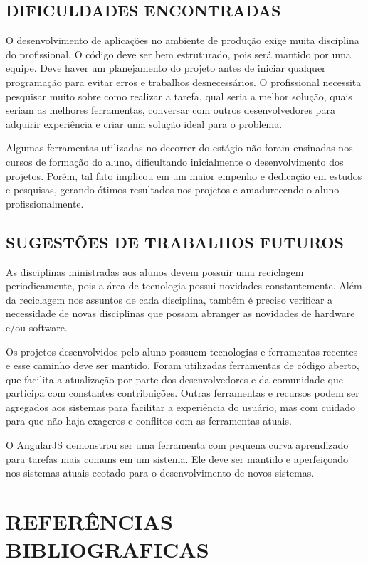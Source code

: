 \documentclass[
  12pt,				%
  openany,
  oneside,
  a4paper,			%
  english,			%
  brazil
]{article}
\numberwithin{figure}{section}
\numberwithin{table}{section}
\begin{document}
\subsection{DIFICULDADES ENCONTRADAS}

O desenvolvimento de aplicações no ambiente de produção exige muita disciplina do profissional. O código deve ser bem estruturado, pois será mantido por uma equipe. Deve haver um planejamento do projeto antes de iniciar qualquer programação para evitar erros e trabalhos desnecessários. O profissional necessita pesquisar muito sobre como realizar a tarefa, qual seria a melhor solução, quais seriam as melhores ferramentas, conversar com outros desenvolvedores para adquirir experiência e criar uma solução ideal para o problema.

Algumas ferramentas utilizadas no decorrer do estágio não foram ensinadas nos cursos de formação do aluno, dificultando inicialmente o desenvolvimento dos projetos. Porém, tal fato implicou em um maior empenho e dedicação em estudos e pesquisas, gerando ótimos resultados nos projetos e amadurecendo o aluno profissionalmente.


\subsection{SUGESTÕES DE TRABALHOS FUTUROS}

As disciplinas ministradas aos alunos devem possuir uma reciclagem periodicamente,
pois a área de tecnologia possui novidades constantemente. Além da reciclagem nos assuntos de cada disciplina, também é preciso verificar a necessidade de novas disciplinas que possam abranger as novidades de hardware e/ou software.

Os projetos desenvolvidos pelo aluno possuem tecnologias e ferramentas recentes e esse caminho deve ser mantido. Foram utilizadas ferramentas de código aberto, que facilita a atualização por parte dos desenvolvedores e da comunidade que participa com constantes contribuições. Outras ferramentas e recursos podem ser agregados aos sistemas para facilitar a experiência do usuário, mas com cuidado para que não haja exageros e conflitos com as ferramentas atuais.

O AngularJS demonstrou ser uma ferramenta com pequena curva aprendizado para tarefas mais comuns em um sistema. Ele deve ser mantido e aperfeiçoado nos sistemas atuais ecotado para o desenvolvimento de novos sistemas.


\section{REFERÊNCIAS BIBLIOGRAFICAS}
\end{document}
